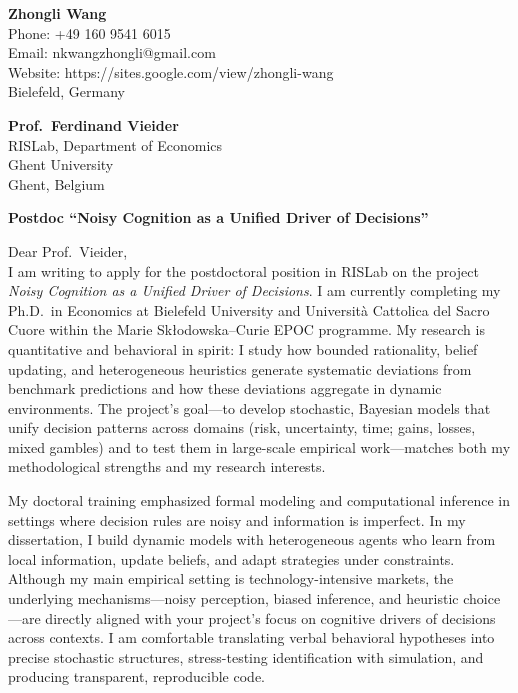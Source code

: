 \documentclass[11pt]{article}
\begin{document}
\noindent
\textbf{Zhongli Wang} \\
Phone: +49 160 9541 6015 \\
Email: nkwangzhongli@gmail.com \\
Website: https://sites.google.com/view/zhongli-wang \\
Bielefeld, Germany \\

\vspace{0.5cm}

\noindent
\textbf{Prof.\ Ferdinand Vieider} \\
RISLab, Department of Economics \\
Ghent University \\
Ghent, Belgium \\

\vspace{0.5cm}

\noindent
\textbf{Postdoc ``Noisy Cognition as a Unified Driver of Decisions''} \\

\vspace{0.3cm}

\noindent Dear Prof.\ Vieider,\\[0.2cm]

I am writing to apply for the postdoctoral position in RISLab on the project \textit{Noisy Cognition as a Unified Driver of Decisions}. I am currently completing my Ph.D.\ in Economics at Bielefeld University and Università Cattolica del Sacro Cuore within the Marie Sk\l{}odowska--Curie EPOC programme. My research is quantitative and behavioral in spirit: I study how bounded rationality, belief updating, and heterogeneous heuristics generate systematic deviations from benchmark predictions and how these deviations aggregate in dynamic environments. The project’s goal---to develop stochastic, Bayesian models that unify decision patterns across domains (risk, uncertainty, time; gains, losses, mixed gambles) and to test them in large-scale empirical work---matches both my methodological strengths and my research interests.

My doctoral training emphasized formal modeling and computational inference in settings where decision rules are noisy and information is imperfect. In my dissertation, I build dynamic models with heterogeneous agents who learn from local information, update beliefs, and adapt strategies under constraints. Although my main empirical setting is technology-intensive markets, the underlying mechanisms---noisy perception, biased inference, and heuristic choice---are directly aligned with your project’s focus on cognitive drivers of decisions across contexts. I am comfortable translating verbal behavioral hypotheses into precise stochastic structures, stress-testing identification with simulation, and producing transparent, reproducible code.
\end{document}
